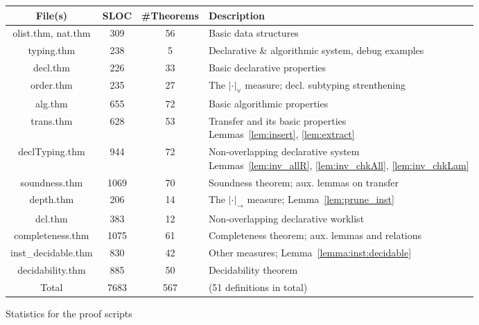 \begin{figure}[ht]
\centering\begin{tabular}{|c|c|c|l|}\hline
    File(s) & SLOC & \#Theorems & Description\\\hline
    olist.thm, nat.thm  &  309 & 56  & Basic data structures\\\hline
    typing.thm          &  238 & 5   & Declarative \& algorithmic system, debug examples\\\hline
    decl.thm            &  226 & 33  & Basic declarative properties\\\hline
    order.thm           &  235 & 27  & The $|\cdot|_\forall$ measure; decl. subtyping strenthening\\\hline
    alg.thm             &  655 & 72  & Basic algorithmic properties\\\hline
    trans.thm           &  628 & 53  & \makecell[l]{Transfer and its basic properties \\
                            Lemmas~\ref{lem:insert}, \ref{lem:extract}}\\\hline
    declTyping.thm      &  944 & 72  & \makecell[l]{Non-overlapping declarative system \\
                            Lemmas~\ref{lem:inv_allR}, \ref{lem:inv_chkAll}, \ref{lem:inv_chkLam}}\\\hline
    soundness.thm       & 1069 & 70  & Soundness theorem; aux. lemmas on transfer\\\hline
    depth.thm           &  206 & 14  & The $|\cdot|_\to$ measure; Lemma~\ref{lem:prune_inst}\\\hline
    dcl.thm             &  383 & 12  & Non-overlapping declarative worklist \\\hline
    completeness.thm    & 1075 & 61  &
                            Completeness theorem; aux. lemmas and relations\\\hline
    inst\_decidable.thm &  830 & 42  & Other measures; Lemma~\ref{lemma:inst:decidable}\\\hline
    decidability.thm    &  885 & 50  & Decidability theorem\\\hline
    Total               & 7683 & 567 & (51 definitions in total)\\\hline
\end{tabular}
\caption{Statistics for the proof scripts}
\label{fig:proof_statistics}
\end{figure}
